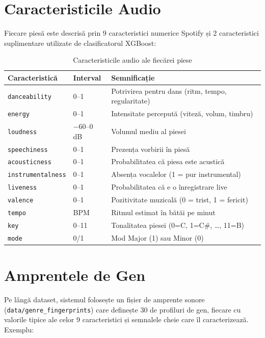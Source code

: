 \documentclass[12pt,a4paper]{report}
\begin{document}
\section{Caracteristicile Audio}

Fiecare piesă este descrisă prin 9 caracteristici numerice Spotify și 2
caracteristici suplimentare utilizate de clasificatorul XGBoost:

\begin{table}[H]
\centering
\renewcommand{\arraystretch}{1.2}
\begin{tabularx}{\textwidth}{@{}llX@{}}
\toprule
\textbf{Caracteristică} & \textbf{Interval} & \textbf{Semnificație} \\
\midrule
\texttt{danceability}     & 0–1    & Potrivirea pentru dans (ritm, tempo, regularitate) \\
\texttt{energy}           & 0–1    & Intensitate percepută (viteză, volum, timbru) \\
\texttt{loudness}         & $-$60–0 dB & Volumul mediu al piesei \\
\texttt{speechiness}      & 0–1    & Prezența vorbirii în piesă \\
\texttt{acousticness}     & 0–1    & Probabilitatea că piesa este acustică \\
\texttt{instrumentalness} & 0–1    & Absența vocalelor (1 = pur instrumental) \\
\texttt{liveness}         & 0–1    & Probabilitatea că e o înregistrare live \\
\texttt{valence}          & 0–1    & Pozitivitate muzicală (0 = trist, 1 = fericit) \\
\texttt{tempo}            & BPM    & Ritmul estimat în bătăi pe minut \\
\midrule
\texttt{key}              & 0–11   & Tonalitatea piesei (0=C, 1=C\#, …, 11=B) \\
\texttt{mode}             & 0/1    & Mod Major (1) sau Minor (0) \\
\bottomrule
\end{tabularx}
\caption{Caracteristicile audio ale fiecărei piese}
\label{tab:features}
\end{table}

\section{Amprentele de Gen}

Pe lângă dataset, sistemul folosește un fișier de amprente sonore
(\texttt{data/genre\_fingerprints}) care definește 30 de profiluri de gen, fiecare
cu valorile tipice ale celor 9 caracteristici și semnalele cheie care îl
caracterizează. Exemplu:
\end{document}
